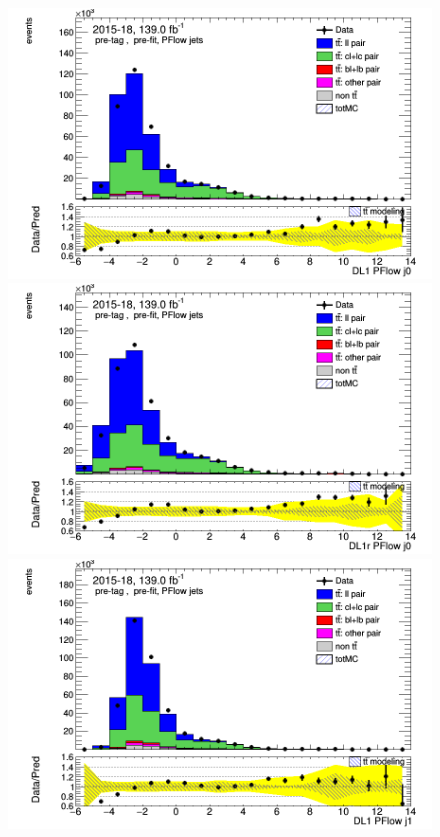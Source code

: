 \documentclass[letterpaper,12pt]{article}
\begin{document}
\begin{figure}[H]
	\begin{minipage}[b]{.45\textwidth}
	\centering
	\includegraphics[width=1\textwidth]{Oct_distributions/pretagNoRwDL1rwithhighpTPFlow_scaledall/DataMC__J0_DL1.png}
	\end{minipage}\hfill
	\begin{minipage}[b]{.45\textwidth}
	\centering
	\includegraphics[width=1\textwidth]{Oct_distributions/pretagNoRwDL1rwithhighpTPFlow_scaledall/DataMC__J0_DL1r.png}
	\end{minipage}\hfill
	\begin{minipage}[b]{.45\textwidth}
	\centering
	\includegraphics[width=1\textwidth]{Oct_distributions/pretagNoRwDL1rwithhighpTPFlow_scaledall/DataMC__J1_DL1.png}

\end{minipage}
\end{figure}
\end{document}
